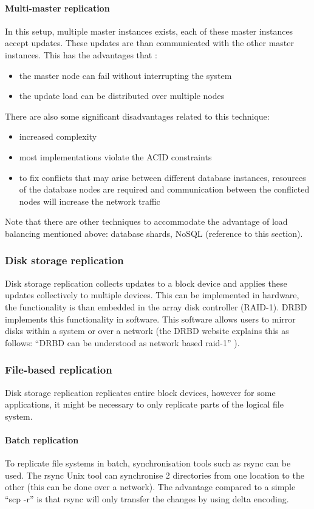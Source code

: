 \documentclass[12pt]{report}
\begin{document}
\paragraph*{Multi-master replication}
In this setup, multiple master instances exists, each of these master
instances accept updates. These updates are than communicated with the
other master instances. 
This has the advantages that :
\begin{itemize}
\item the master node can fail without interrupting the system
\item the update load can be distributed over multiple nodes
\end{itemize}
There are also some significant disadvantages related to this technique:
\begin{itemize} 
\item increased complexity
\item most implementations violate the ACID constraints
\item to fix conflicts that may arise between different database
  instances, resources of the database nodes are required and
  communication between the conflicted nodes will increase the network
  traffic
\end{itemize}
Note that there are other techniques to accommodate the advantage of
load balancing mentioned above: database shards, NoSQL (reference to
this section).

\subsubsection{Disk storage replication}
Disk storage replication collects updates to a block device and
applies these updates collectively to multiple devices.
This can be implemented in hardware, the functionality is than
embedded in the array disk controller (RAID-1).
DRBD \cite{drbd_soft:2013} implements this functionality in software.
This software allows users to mirror disks within a system or over a
network (the DRBD website explains this as follows: ``DRBD can be
understood as network based raid-1'' \cite{drbd_soft:2013}).

\subsubsection{File-based replication}
Disk storage replication replicates entire block devices, however for
some applications, it might be necessary to only replicate parts of
the logical file system.
\paragraph*{Batch replication}
To replicate file systems in batch, synchronisation tools such as
rsync \cite{rsync_software:2013} can be
used. The rsync Unix tool can synchronise 2 directories from one location to the
other (this can be done over a network). The advantage compared to a
simple ``scp -r'' is that rsync will only transfer the changes by using
delta encoding.
\end{document}
